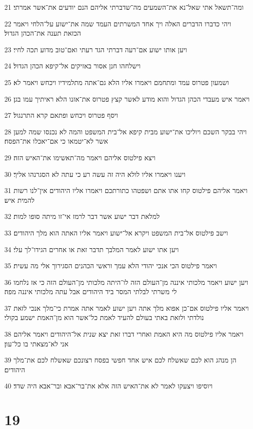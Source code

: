 \par 21 ומה־תשאל אתי שאל־נא את־השמעים מה־שדברתי אליהם הנם יודעים את־אשר אמרתי׃
\par 22 ויהי כדברו הדברים האלה ויך אחד המשרתים העמד שמה את־ישוע על־הלחי ויאמר הכזאת תענה את־הכהן הגדול׃
\par 23 ויען אותו ישוע אם־רעה דברתי הגד רעתי ואם־טוב מדוע תכה לחיי׃
\par 24 וישלחהו חנן אסור באזיקים אל־קיפא הכהן הגדול׃
\par 25 ושמעון פטרוס עמד ומתחמם ויאמרו אליו הלא גם־אתה מתלמידיו ויכחש ויאמר לא׃
\par 26 ויאמר איש מעבדי הכהן הגדול והוא מודע לאשר קצץ פטרוס את־אזנו הלא ראיתיך עמו בגן׃
\par 27 ויסף פטרוס ויכחש ופתאם קרא התרנגול׃
\par 28 ויהי בבקר השכם ויוליכו את־ישוע מבית קיפא אל־בית המשפט והמה לא נכנסו שמה למען אשר לא־יטמאו כי אם־יאכלו את־הפסח׃
\par 29 ויצא פילטוס אליהם ויאמר מה־תאשימו את־האיש הזה׃
\par 30 ויענו ויאמרו אליו לולא היה זה עשה רע כי עתה לא הסגרנהו אליך׃
\par 31 ויאמר אליהם פילטוס קחו אתו אתם ושפטהו כתורתכם ויאמרו אליו היהודים אין־לנו רשות להמית איש׃
\par 32 למלאת דבר ישוע אשר דבר לרמז אי־זו מיתה סופו למות׃
\par 33 וישב פילטוס אל־בית המשפט ויקרא אל־ישוע ויאמר אליו האתה הוא מלך היהודים׃
\par 34 ויען אתו ישוע לאמר המלבך תדבר זאת או אחרים הגידו־לך עלי׃
\par 35 ויאמר פילטוס הכי אנכי יהודי הלא עמך וראשי הכהנים הסגירוך אלי מה עשית׃
\par 36 ויען ישוע ויאמר מלכותי איננה מן־העולם הזה לו־היתה מלכותי מן־העולם הזה כי אז נלחמו לי משרתי לבלתי המסר ביד היהודים אבל עתה מלכותי איננה מפה׃
\par 37 ויאמר אליו פילטוס אם־כן אפוא מלך אתה ויען ישוע לאמר אתה אמרת כי־מלך אנכי לזאת נולדתי ולזאת באתי בעולם להעיד לאמת כל־אשר הוא מן־האמת ישמע בקולי׃
\par 38 ויאמר אליו פילטוס מה היא האמת ואחרי דברו זאת יצא שנית אל־היהודים ויאמר אליהם אני לא־מצאתי בו כל־עון׃
\par 39 הן מנהג הוא לכם שאשלח לכם איש אחד חפשי בפסח רצונכם שאשלח לכם את־מלך היהודים׃
\par 40 ויוסיפו ויצעקו לאמר לא את־האיש הזה אלא את־בר־אבא ובר־אבא היה שדד׃

\chapter{19}

